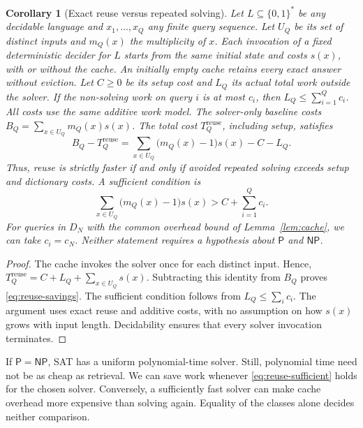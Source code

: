 \documentclass[11pt,a4paper]{article}
\numberwithin{equation}{section}
\newcommand{\Pclass}{\mathsf{P}}
\newcommand{\NPclass}{\mathsf{NP}}
\newcommand{\bits}{\{0,1\}}
\theoremstyle{plain}
\newtheorem{corollary}[lemma]{Corollary}
\theoremstyle{definition}
\theoremstyle{remark}
\begin{document}
\begin{corollary}[Exact reuse versus repeated solving]
\label{cor:reuse-savings}
Let $L\subseteq\bits^*$ be any decidable language and $x_1,\ldots,x_Q$ any finite query sequence. Let $U_Q$ be its set of distinct inputs and $m_Q(x)$ the multiplicity of $x$. Each invocation of a fixed deterministic decider for $L$ starts from the same initial state and costs $s(x)$, with or without the cache. An initially empty cache retains every exact answer without eviction. Let $C\geq0$ be its setup cost and $L_Q$ its actual total work outside the solver. If the non-solving work on query $i$ is at most $c_i$, then $L_Q\leq\sum_{i=1}^Q c_i$. All costs use the same additive work model. The solver-only baseline costs $B_Q=\sum_{x\in U_Q}m_Q(x)s(x)$. The total cost $T_Q^{\mathrm{reuse}}$, including setup, satisfies
\begin{equation}
\boxed{B_Q-T_Q^{\mathrm{reuse}}
=\sum_{x\in U_Q}\bigl(m_Q(x)-1\bigr)s(x)-C-L_Q.}
\label{eq:reuse-savings}
\end{equation}
Thus, reuse is strictly faster if and only if avoided repeated solving exceeds setup and dictionary costs. A sufficient condition is
\begin{equation}
\sum_{x\in U_Q}\bigl(m_Q(x)-1\bigr)s(x)>C+\sum_{i=1}^Q c_i.
\label{eq:reuse-sufficient}
\end{equation}
For queries in $D_N$ with the common overhead bound of Lemma~\ref{lem:cache}, we can take $c_i=c_N$. Neither statement requires a hypothesis about $\Pclass$ and $\NPclass$.
\end{corollary}

\begin{proof}
The cache invokes the solver once for each distinct input. Hence,
$T_Q^{\mathrm{reuse}}=C+L_Q+\sum_{x\in U_Q}s(x)$.
Subtracting this identity from $B_Q$ proves \eqref{eq:reuse-savings}. The sufficient condition follows from $L_Q\leq\sum_i c_i$. The argument uses exact reuse and additive costs, with no assumption on how $s(x)$ grows with input length. Decidability ensures that every solver invocation terminates.
\end{proof}

If $\Pclass=\NPclass$, SAT has a uniform polynomial-time solver. Still, polynomial time need not be as cheap as retrieval. We can save work whenever \eqref{eq:reuse-sufficient} holds for the chosen solver. Conversely, a sufficiently fast solver can make cache overhead more expensive than solving again. Equality of the classes alone decides neither comparison.
\end{document}

